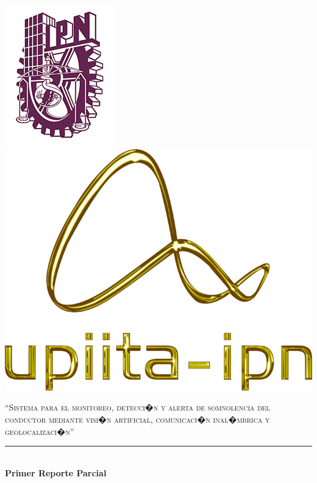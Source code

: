 \documentclass[12pt,letterpaper]{article}
\begin{document}
\renewcommand{\tablename}{Tabla}
\renewcommand{\listtablename}{�ndice de tablas}

\begin{titlepage}

\newcommand{\HRule}{\rule{\linewidth}{0.3mm}}

\includegraphics[scale=0.45]{imagenes/ipn}
\hspace{10cm}
\includegraphics[scale=0.15]{imagenes/upiita}
\\


\begin{center}


\textsc{\Large ``Sistema para el monitoreo, detecci�n y alerta de somnolencia del conductor mediante visi�n artificial, comunicaci�n inal�mbrica y geolocalizaci�n''}\\[0.5cm]



\HRule \\[0.4cm]
{ \huge \bfseries Primer Reporte Parcial}\\[0.4cm]


\end{center}
\end{titlepage}
\end{document}
